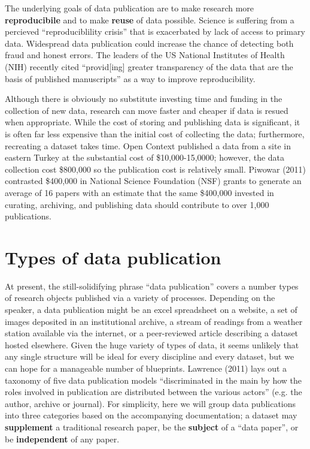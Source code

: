 \documentclass[10pt,twocolumn]{article}
\begin{document}
The underlying goals of data publication are to make research more \textbf{reproducibile} and to make \textbf{reuse} of data possible.
Science is suffering from a percieved ``reproduciblility crisis''\cite{mobley_survey_2013,pashler_is_2012,zimmer_rise_2012,hiltzik_science_2013,begley_drug_2012} that is exacerbated by lack of access to primary data.
Widespread data publication could increase the chance of detecting both fraud and honest errors.\cite{drew_lost_2013}
The leaders of the US National Institutes of Health (NIH) recently cited ``provid[ing] greater transparency of the data that are the basis of published manuscripts'' as a way to improve reproducibility.\cite{collins_nih_2014}

Although there is obviously no substitute investing time and funding in the collection of new data, research can move faster and cheaper if data is resued when appropriate. 
While the cost of storing and publishing data is significant, it is often far less expensive than the initial cost of collecting the data; furthermore, recreating a dataset takes time.
Open Context published a data from a site in eastern Turkey at the substantial cost of \$10,000-15,0000; however, the data collection cost \$800,000 so the publication cost is relatively small.\cite{kansa_we_2014}
Piwowar (2011) contrasted \$400,000 in National Science Foundation (NSF) grants to generate an average of 16 papers with an estimate that the same \$400,000 invested in curating, archiving, and publishing data should contribute to over 1,000 publications.\cite{piwowar_data_2011}


\section*{Types of data publication}\label{types-of-data-publication}

At present, the still-solidifying phrase ``data publication'' covers a number types of research objects published via a variety of processes.
Depending on the speaker, a data publication might be an excel spreadsheet on a website, a set of images deposited in an institutional archive, a stream of readings from a weather station available via the internet, or a peer-reviewed article describing a dataset hosted elsewhere.
Given the huge variety of types of data, it seems unlikely that any single structure will be ideal for every discipline and every dataset, but we can hope for a manageable number of blueprints.
Lawrence (2011) lays out a taxonomy of five data publication models ``discriminated in the main by how the roles involved in publication are distributed between the various actors'' (e.g. the author, archive or journal).\cite{lawrence_data_2011}
For simplicity, here we will group data publications into three categories based on the accompanying documentation; a dataset may \textbf{supplement} a traditional research paper, be the \textbf{subject} of a ``data paper'', or be \textbf{independent} of any paper.
\end{document}
